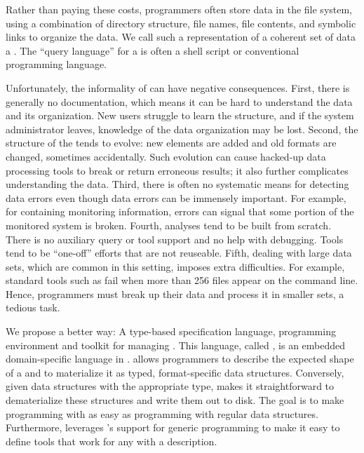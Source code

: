 Rather than paying these costs, programmers often store data in
the file system, using a combination of directory structure, file
names, file contents, and symbolic links to organize the data.  We call such a
representation of a coherent set of data a \textit{\filestore{}}.
The ``query language'' for a \filestore{}
is often a shell script or conventional programming language.

Unfortunately, the informality of \filestores{} can have
negative consequences.  First, there is generally no documentation,
which means it can be hard to understand the data and its
organization.  New users struggle to learn the structure, and if
the system administrator leaves, knowledge of the data
organization may be lost.  Second, the structure of the \filestore{} tends
to evolve: new elements are added and old formats are changed, sometimes
accidentally.  Such evolution can cause hacked-up data processing
tools to break or return erroneous results; it also further complicates
understanding the data.  Third, there is often no
systematic means for detecting data errors even though data errors can
be immensely
important.  For example, for \filestores{} containing monitoring information,
errors can signal that some portion of the monitored system is broken.
Fourth, analyses tend to be built from scratch.
There is no auxiliary query or tool support and no help with debugging.
Tools tend to be ``one-off'' efforts that are not
reuseable.  Fifth, dealing with
large data sets, which are common in this setting, imposes extra
difficulties.  For example,  standard tools
such as  fail when more than 256 files appear on the
command line.  Hence, programmers must  break up their data
and process it in smaller sets, a tedious task.

We propose a better way: A type-based
specification language, programming environment and toolkit for
managing \filestores{}.  
This language, called \forest{}, is an embedded domain-specific
language in \haskell{}.
\forest{} allows programmers to describe the expected shape of a
\filestore{} and to materialize it as typed,
format-specific \haskell{} data structures.  Conversely,
given data structures with the appropriate type, \forest{}
makes it straightforward to dematerialize these structures
and write them out to disk.  The
goal is to make programming with \filestores{} as
easy as programming with regular \haskell{} data
structures.  Furthermore, \forest{} leverages
\haskell{}'s support for generic programming to make it easy to define
tools that work for any \filestore{} with a \forest{} description.  


